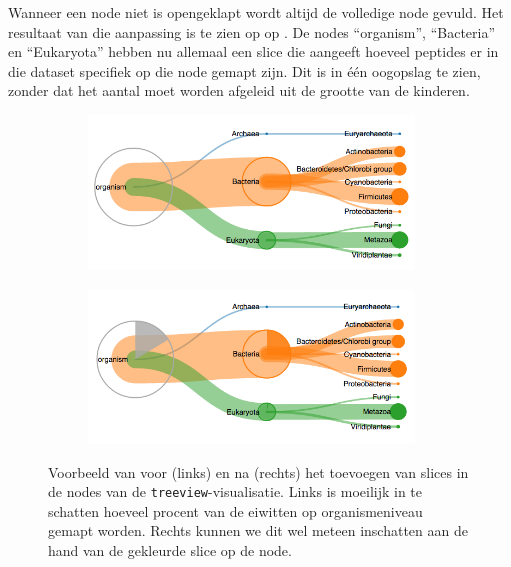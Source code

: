 Wanneer een node niet is opengeklapt wordt altijd de volledige node gevuld. Het 
resultaat van die aanpassing is te zien op  op 
. De nodes ``organism'', ``Bacteria'' en 
``Eukaryota'' hebben nu allemaal een slice die aangeeft hoeveel peptides er in 
die dataset specifiek op die node gemapt zijn. Dit is in één oogopslag te 
zien, zonder dat het aantal moet worden afgeleid uit de grootte van 
de kinderen.

\begin{figure}
\centering
\begin{subfigure}{0.45\textwidth}
    \centering
    \includegraphics[width=0.95\textwidth]{includes/treeviewnoarc}
    \label{fig:treeviewarcbefore}
\end{subfigure}%
\begin{subfigure}{0.45\textwidth}
    \centering
    \includegraphics[width=0.95\textwidth]{includes/treeviewarc}
    \label{fig:treeviewarcafter}
\end{subfigure}
\caption{Voorbeeld van voor (links) en na (rechts) het toevoegen van slices in 
de nodes van de \texttt{treeview}-visualisatie. Links is moeilijk in te 
schatten hoeveel procent van de eiwitten op organismeniveau gemapt worden. 
Rechts kunnen we dit wel meteen inschatten aan de hand van de gekleurde slice 
op de node.}
\label{fig:treeviewarc}
\end{figure}

